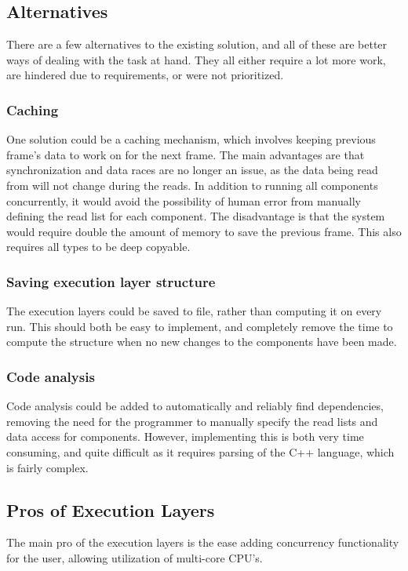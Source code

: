 \subsection{Alternatives}
There are a few alternatives to the existing solution, and all of these are better ways of dealing with the task at hand.
They all either require a lot more work, are hindered due to requirements, or were not prioritized.

\subsubsection{Caching}
One solution could be a caching mechanism, which involves keeping previous frame's data to work on for the next frame\cite[p.930]{game_engine_architecture}.
The main advantages are that synchronization and data races are no longer an issue, as the data being read from will not change during the reads.
In addition to running all components concurrently, it would avoid the possibility of human error from manually defining the read list for each component.
The disadvantage is that the system would require double the amount of memory to save the previous frame.
This also requires all types to be deep copyable.

\subsubsection{Saving execution layer structure}
The execution layers could be saved to file, rather than computing it on every run.
This should both be easy to implement, and completely remove the time to compute the structure when no new changes to the components have been made.

\subsubsection{Code analysis}
\label{par:detailed_execution_layers_code_analysis}
Code analysis could be added to automatically and reliably find dependencies, removing the need for the programmer to manually specify the read lists and data access for components.
However, implementing this is both very time consuming, and quite difficult as it requires parsing of the C++ language, which is fairly complex.

\subsection{Pros of Execution Layers}
The main pro of the execution layers is the ease adding concurrency functionality for the user,
allowing utilization of multi-core CPU's.

